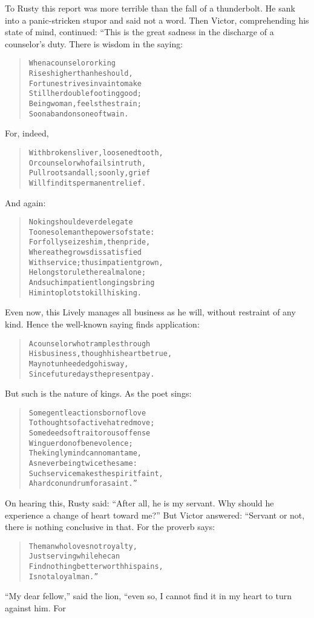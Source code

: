 \documentclass[article, twoside, 14pt]{memoir}
\renewenvironment{verbatim}{%
\begin{quote}%
\vskip -10pt%
\begin{alltt}\normalfont\large}{\end{alltt}%
\end{quote}%
\vskip -10pt
} %
\begin{document}
To Rusty this report was more terrible than the fall of a
thunderbolt. He sank into a panic-stricken stupor and said not a
word. Then Victor, comprehending his state of mind, continued:
“This is the great sadness in the discharge of a counselor's duty.
There is wisdom in the saying:

\begin{verbatim}
When a counselor or king
    Rises higher than he should,
Fortune strives in vain to make
    Still her double footing good;
Being woman, feels the strain;
Soon abandons one of twain.
\end{verbatim}
For, indeed,

\begin{verbatim}
With broken sliver, loosened tooth,
Or counselor who fails in truth,
Pull roots and all; so only, grief
Will find its permanent relief.
\end{verbatim}
And again:

\begin{verbatim}
No king should ever delegate
To one sole man the powers of state:
For folly seizes him, then pride,
Whereat he grows dissatisfied
With service; thus impatient grown,
He longs to rule the realm alone;
And such impatient longings bring
Him into plots to kill his king.
\end{verbatim}
Even now, this Lively manages all business as he will, without
restraint of any kind. Hence the well-known saying finds
application:

\begin{verbatim}
A counselor who tramples through
His business, though his heart be true,
May not unheeded go his way,
Since future days the present pay.
\end{verbatim}
But such is the nature of kings. As the poet sings:

\begin{verbatim}
Some gentle actions born of love
To thoughts of active hatred move;
Some deeds of traitorous offense
Win guerdon of benevolence;
The kingly mind can no man tame,
As never being twice the same:
Such service makes the spirit faint,
A hard conundrum for a saint.”
\end{verbatim}
On hearing this, Rusty said:
``After all, he is my servant. Why should he experience a change of heart toward me?''
But Victor answered: “Servant or not, there is nothing conclusive
in that. For the proverb says:

\begin{verbatim}
The man who loves not royalty,
    Just serving while he can
Find nothing better worth his pains,
    Is not a loyal man.”
\end{verbatim}
``My dear fellow,'' said the lion, “even so, I cannot find it in my
heart to turn against him. For
\end{document}
